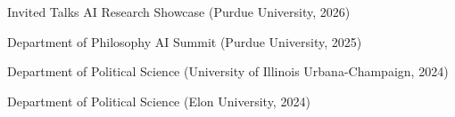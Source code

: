 \documentclass{resume} %
\begin{document}
\begin{rSection}{Invited Talks}
AI Research Showcase (Purdue University, 2026)

Department of Philosophy AI Summit (Purdue University, 2025)

Department of Political Science (University of Illinois Urbana-Champaign, 2024)

Department of Political Science (Elon University, 2024)



\end{rSection}
\end{document}
